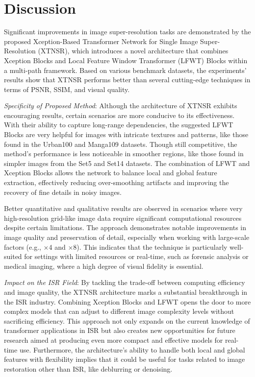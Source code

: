 \documentclass[twocolumn]{svjour3}          %
\begin{document}
\section{Discussion}

Significant improvements in image super-resolution tasks are demonstrated by the proposed Xception-Based Transformer Network for Single Image Super-Resolution (XTNSR), which introduces a novel architecture that combines Xception Blocks and Local Feature Window Transformer (LFWT) Blocks within a multi-path framework. Based on various benchmark datasets, the experiments' results show that XTNSR performs better than several cutting-edge techniques in terms of PSNR, SSIM, and visual quality.

\textit{Specificity of Proposed Method}: Although the architecture of XTNSR exhibits encouraging results, certain scenarios are more conducive to its effectiveness. With their ability to capture long-range dependencies, the suggested LFWT Blocks are very helpful for images with intricate textures and patterns, like those found in the Urban100 and Manga109 datasets. Though still competitive, the method's performance is less noticeable in smoother regions, like those found in simpler images from the Set5 and Set14 datasets. The combination of LFWT and Xception Blocks allows the network to balance local and global feature extraction, effectively reducing over-smoothing artifacts and improving the recovery of fine details in noisy images.

Better quantitative and qualitative results are observed in scenarios where very high-resolution grid-like image data require significant computational resources despite certain limitations. The approach demonstrates notable improvements in image quality and preservation of detail, especially when working with large-scale factors (e.g., ×4 and ×8). This indicates that the technique is particularly well-suited for settings with limited resources or real-time, such as forensic analysis or medical imaging, where a high degree of visual fidelity is essential.

\textit{Impact on the ISR Field}: By tackling the trade-off between computing efficiency and image quality, the XTNSR architecture marks a substantial breakthrough in the ISR industry. Combining Xception Blocks and LFWT opens the door to more complex models that can adjust to different image complexity levels without sacrificing efficiency. This approach not only expands on the current knowledge of transformer applications in ISR but also creates new opportunities for future research aimed at producing even more compact and effective models for real-time use. Furthermore, the architecture's ability to handle both local and global features with flexibility implies that it could be useful for tasks related to image restoration other than ISR, like deblurring or denoising.
\end{document}
